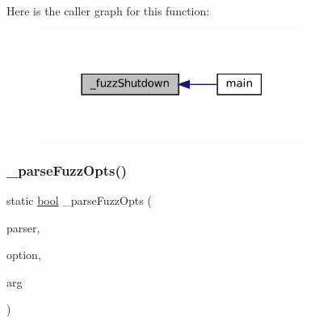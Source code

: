 Here is the caller graph for this function\+:
\nopagebreak
\begin{figure}[H]
\begin{center}
\leavevmode
\includegraphics[width=247pt]{fuzz-main_8c_a4c46953207b5f03a88084e0d3918c9d1_icgraph}
\end{center}
\end{figure}
\mbox{\label{fuzz-main_8c_abe6668fd69b615464e23aff05af1b70b}} 
\subsubsection{\texorpdfstring{\+\_\+parse\+Fuzz\+Opts()}{\_parseFuzzOpts()}}
{\footnotesize\ttfamily static \mbox{\hyperlink{libretro_8h_a4a26dcae73fb7e1528214a068aca317e}{bool}} \+\_\+parse\+Fuzz\+Opts (\begin{DoxyParamCaption}\item[{struct m\+Sub\+Parser $\ast$}]{parser,  }\item[{\mbox{\hyperlink{ioapi_8h_a787fa3cf048117ba7123753c1e74fcd6}{int}}}]{option,  }\item[{const char $\ast$}]{arg }\end{DoxyParamCaption})\hspace{0.3cm}{\ttfamily [static]}}

